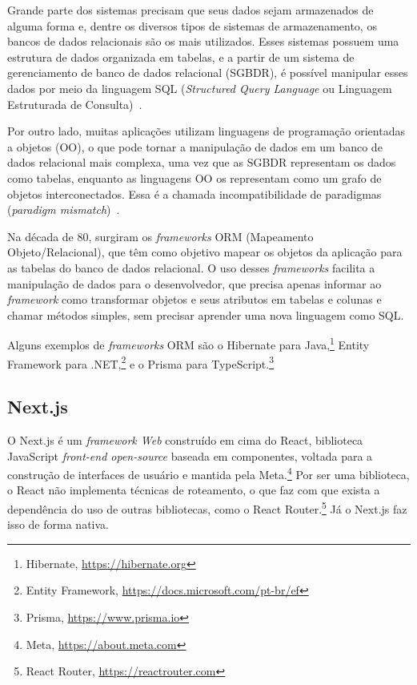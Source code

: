 Grande parte dos sistemas precisam que seus dados sejam armazenados de alguma forma e,
dentre os diversos tipos de sistemas de armazenamento, os bancos de dados relacionais são
os mais utilizados. Esses sistemas possuem uma estrutura de dados organizada em tabelas, e a partir de 
um sistema de gerenciamento de banco de dados relacional (SGBDR), é possível manipular esses dados
por meio da linguagem SQL (\textit{Structured Query Language} ou Linguagem Estruturada de Consulta)~\cite{silberschatz:2019}.

Por outro lado, muitas aplicações utilizam linguagens de programação orientadas a objetos (OO), o que
pode tornar a manipulação de dados em um banco de dados relacional mais complexa, uma vez que
as SGBDR representam os dados como tabelas, enquanto as linguagens OO os representam como um grafo 
de objetos interconectados. Essa é a chamada incompatibilidade de paradigmas (\textit{paradigm mismatch})~\cite{hibernate:2010,bauer:2005}.

Na década de 80, surgiram os \textit{frameworks} ORM (Mapeamento Objeto/Relacional), que têm como objetivo
mapear os objetos da aplicação para as tabelas do banco de dados relacional. O uso desses \textit{frameworks} 
facilita a manipulação de dados para o desenvolvedor, que precisa apenas informar ao \textit{framework}
como transformar objetos e seus atributos em tabelas e colunas e chamar métodos simples, sem precisar
aprender uma nova linguagem como SQL.

Alguns exemplos de \textit{frameworks} ORM são o Hibernate para Java,\footnote{Hibernate, \url{https://hibernate.org}}
Entity Framework para .NET,\footnote{Entity Framework, \url{https://docs.microsoft.com/pt-br/ef}} e o 
Prisma para TypeScript.\footnote{Prisma, \url{https://www.prisma.io}}



\subsection{Next.js}
\label{sec-fundteo-framework-next}


O Next.js é um \textit{framework Web} construído em cima do React, biblioteca JavaScript \textit{front-end open-source}
baseada em componentes, voltada para a construção de interfaces de usuário e mantida pela Meta.\footnote{Meta, \url{https://about.meta.com}}
Por ser uma biblioteca, o React não implementa 
técnicas de roteamento, o que faz com que exista a dependência do uso de outras bibliotecas, 
como o React Router.\footnote{React Router, \url{https://reactrouter.com}}
Já o Next.js faz isso de forma nativa. 

